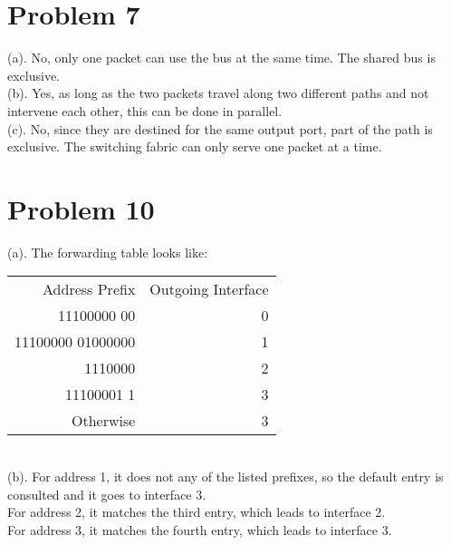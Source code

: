 \documentclass[titlepage, paper=a4, fontsize=11pt]{scrartcl} %
\numberwithin{equation}{section} %
\numberwithin{table}{section} %
\begin{document}

\section*{Problem 7}
(a).
No, only one packet can use the bus at the same time. The shared bus is exclusive. \\

(b).
Yes, as long as the two packets travel along two different paths and not intervene each other, this can be done in parallel. \\

(c).
No, since they are destined for the same output port, part of the path is exclusive. The switching fabric can only serve one packet at a time. \\




\section*{Problem 10}
(a).
The forwarding table looks like: \\
\begin{tabular}{ r | r  }
  Address Prefix & Outgoing Interface \\
  11100000 00 & 0 \\
  11100000 01000000 & 1 \\
  1110000 & 2 \\
  11100001 1 & 3 \\
  Otherwise & 3 \\
\end{tabular}
\\

(b).
For address 1, it does not any of the listed prefixes, so the default entry is consulted and it goes to interface 3. \\
For address 2, it matches the third entry, which leads to interface 2. \\
For address 3, it matches the fourth entry, which leads to interface 3. \\
\end{document}
